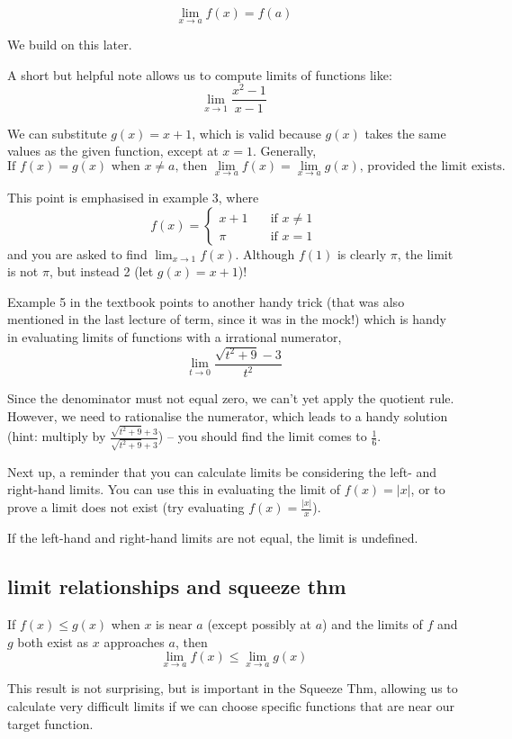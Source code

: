 \documentclass[10pt,a4paper]{report}
\begin{document}
$$
	\lim_{x \to a} f(x) = f(a)
$$

We build on this later.

A short but helpful note allows us to compute limits of functions like:
$$
	\lim_{x \to 1} \frac{x^2 - 1}{x - 1}
$$

We can substitute $g(x) = x + 1$, which is valid because $g(x)$ takes the same values as the given function, except at $x = 1$. Generally,
$$
	\text{If } f(x) = g(x) \text{ when } x \ne a \text{, then } \lim_{x \to a} f(x) = \lim_{x \to a} g(x) \text{, provided the limit exists.}
$$

This point is emphasised in example 3, where
$$
	f(x) = 
	\begin{cases}
		x + 1 & \quad \text{if } x \ne 1 \\
		\pi & \quad \text{if } x = 1
	\end{cases}
$$
and you are asked to find $\lim_{x \to 1} f(x)$. Although $f(1)$ is clearly $\pi$, the limit is not $\pi$, but instead 2 (let $g(x) = x+1$)!

Example 5 in the textbook points to another handy trick (that was also mentioned in the last lecture of term, since it was in the mock!) which is handy in evaluating limits of functions with a irrational numerator,
$$
	\lim_{t \to 0} \frac{\sqrt{t^2 + 9} - 3}{t^2}
$$

Since the denominator must not equal zero, we can't yet apply the quotient rule. However, we need to rationalise the numerator, which leads to a handy solution (hint: multiply by $\frac{\sqrt{t^2 + 9} + 3}{\sqrt{t^2 + 9} + 3}$) -- you should find the limit comes to $\frac{1}{6}$.

Next up, a reminder that you can calculate limits be considering the left- and right-hand limits. You can use this in evaluating the limit of $f(x) = |x|$, or to prove a limit does not exist (try evaluating $f(x) = \frac{|x|}{x}$).

If the left-hand and right-hand limits are not equal, the limit is undefined.

\subsection{limit relationships and squeeze thm}

If $f(x) \leq g(x)$ when $x$ is near $a$ (except possibly at $a$) and the limits of $f$ and $g$ both exist as $x$ approaches $a$, then
$$
	\lim_{x \to a} f(x) \leq \lim_{x \to a} g(x)
$$

This result is not surprising, but is important in the Squeeze Thm, allowing us to calculate very difficult limits if we can choose specific functions that are near our target function.
\end{document}
